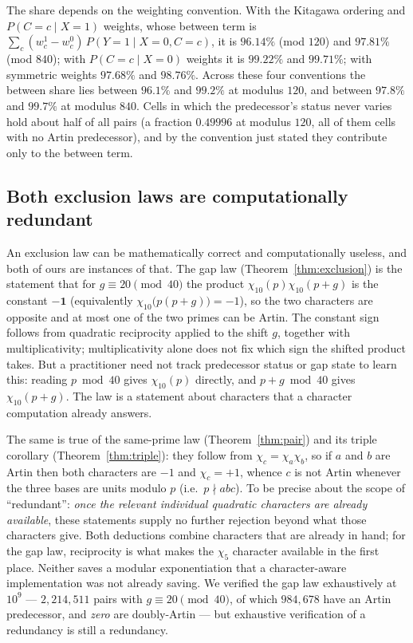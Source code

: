 \documentclass[11pt,reqno]{amsart}
\theoremstyle{plain}
\theoremstyle{definition}
\begin{document}
The share depends on the weighting convention. With the Kitagawa ordering and
$P(C{=}c\mid X{=}1)$ weights, whose between term is
$\sum_c (w_c^1-w_c^0)\,P(Y{=}1\mid X{=}0, C{=}c)$, it is $96.14\%$ (mod $120$) and $97.81\%$
(mod $840$); with $P(C{=}c\mid X{=}0)$ weights it is $99.22\%$ and $99.71\%$; with symmetric
weights $97.68\%$ and $98.76\%$. Across these four conventions the between share lies between
$96.1\%$ and $99.2\%$ at modulus $120$, and between $97.8\%$ and $99.7\%$ at modulus $840$.
Cells in which the predecessor's status never varies hold about half of all pairs (a fraction
$0.49996$ at modulus $120$, all of them cells with no Artin predecessor), and by the convention
just stated they contribute only to the between term.

\subsection*{Both exclusion laws are computationally redundant}
An exclusion law can be mathematically correct and computationally useless, and both of ours are
instances of that. The gap law (Theorem~\ref{thm:exclusion}) is the statement that for
$g \equiv 20 \pmod{40}$ the product $\chi_{10}(p)\chi_{10}(p+g)$ is the constant $\mathbf{-1}$
(equivalently $\chi_{10}\bigl(p(p+g)\bigr) = -1$), so the two characters are opposite and at most
one of the two primes can be Artin. The constant sign follows from quadratic reciprocity applied
to the shift $g$, together with multiplicativity; multiplicativity alone does not fix which sign
the shifted product takes. But a practitioner need not track predecessor status or gap state to
learn this: reading $p \bmod 40$ gives $\chi_{10}(p)$ directly, and $p+g \bmod 40$ gives
$\chi_{10}(p+g)$. The law is a statement about characters that a character computation already
answers.

The same is true of the same-prime law (Theorem~\ref{thm:pair}) and its triple corollary
(Theorem~\ref{thm:triple}): they follow from $\chi_c = \chi_a\chi_b$, so if $a$ and $b$ are Artin
then both characters are $-1$ and $\chi_c = +1$, whence $c$ is not Artin whenever the three bases are units modulo $p$
(i.e.\ $p\nmid abc$). To be precise about the scope of ``redundant'': \emph{once the relevant individual
quadratic characters are already available}, these statements supply no further rejection beyond
what those characters give. Both deductions combine characters that are already in hand; for
the gap law, reciprocity is what makes the $\chi_5$ character available in the first place.
Neither saves a
modular exponentiation that a character-aware implementation was not already saving. We verified
the gap law exhaustively at $10^9$ --- $2{,}214{,}511$ pairs with $g \equiv 20 \pmod{40}$, of
which $984{,}678$ have an Artin predecessor, and \emph{zero} are doubly-Artin --- but exhaustive
verification of a redundancy is still a redundancy.
\end{document}
